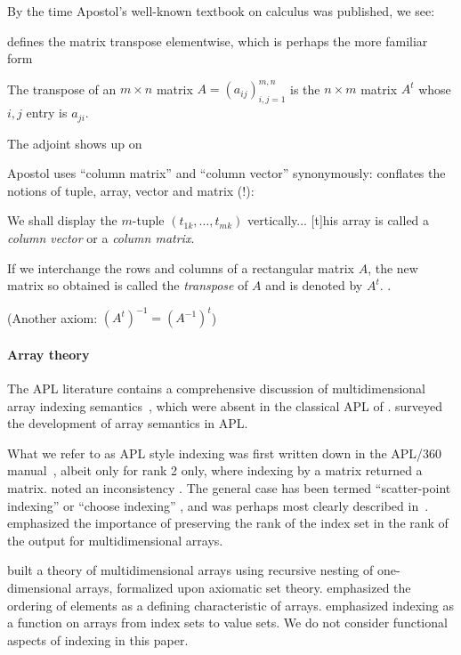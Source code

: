 By the time Apostol's well-known textbook on calculus was published, we see:

\cite[p. 91]{Apostol1969} defines the matrix transpose elementwise, which is perhaps the more familiar form

The transpose of an $m \times n$ matrix $A = \left( a_{ij} \right)^{m,n}_{i,j=1}$ is the $n \times m$ matrix $A^t$ whose $i, j$ entry is $a_{ji}$.

The adjoint shows up on \cite[p. 122]{Apostol1969}

Apostol uses ``column matrix'' and ``column vector'' synonymously: \cite[p. 592]{Apostol1967} conflates the notions of tuple, array, vector and matrix (!):

We shall display the $m$-tuple $(t_{1k}, \dots, t_{mk})$ vertically... [t]his array is called a \textit{column vector} or a \textit{column matrix}.

If we interchange the rows and columns of a rectangular matrix $A$, the new matrix so obtained is called the \textit{transpose} of $A$ and is denoted by $A^t$. \cite[p. 615, Exercise 7]{Apostol1967}.

(Another axiom: $(A^t)^{-1} = (A^{-1})^t$)

\paragraph{Array theory} The APL literature contains a comprehensive discussion
of multidimensional array indexing semantics~\cite{Brown1982}, which were
absent in the classical APL of \cite{Iverson1962}. \cite{Ruehr1982,Gerth1988}
surveyed the development of array semantics in APL.

What we refer to as APL style indexing was first written down in the APL/360
manual~\cite{Falkoff1968}, albeit only for rank 2 only, where indexing by a
matrix returned a matrix. \cite{Haegi1976} noted an inconsistency . The general
case has been termed ``scatter-point indexing'' or ``choose indexing''
\cite{Brown1972,Ruehr1982}, and was perhaps most clearly described
in~\cite{More1979}. \cite{Gull1979} emphasized the importance of preserving
the rank of the index set in the rank of the output for multidimensional
arrays.

\cite{More1973} built a theory of multidimensional arrays using recursive
nesting of one-dimensional arrays, formalized upon axiomatic set theory.
\cite{Ghandour1973} emphasized the ordering of elements as a defining
characteristic of arrays. \cite{Gerth1988} emphasized indexing as a function on
arrays from index sets to value sets. We do not consider functional aspects of
indexing in this paper.

